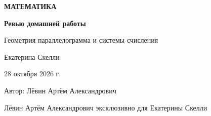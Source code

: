 \documentclass[a4paper,11pt]{article}
\begin{document}
\thispagestyle{empty}
\vspace*{38mm}
\begin{center}
{\small\bfseries\color{accent} МАТЕМАТИКА}\par\vspace{12mm}
{\Huge\bfseries\color{navy} Ревью домашней работы}\par\vspace{7mm}
{\large Геометрия параллелограмма и системы счисления}\par\vspace{15mm}
{\large Екатерина Скелли}\par\vspace{5mm}
{\large 28 октября 2026 г.}\par\vspace{26mm}
{\normalsize Автор: Лёвин Артём Александрович}
\end{center}
\vfill
\begin{center}
\par\vspace{6mm}
{\footnotesize\color{muted} Лёвин Артём Александрович эксклюзивно для Екатерины Скелли}
\end{center}
\clearpage
\end{document}
